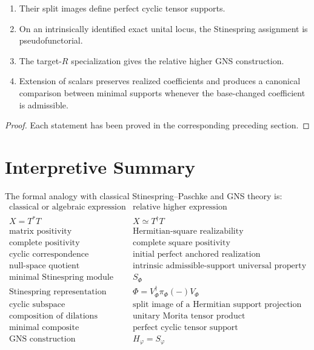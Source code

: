 \begin{theorem}
\begin{enumerate}
  \item Their split images define perfect cyclic tensor supports.

  \item On an intrinsically identified exact unital locus, the Stinespring
  assignment is pseudofunctorial.

  \item The target-\(R\) specialization gives the relative higher GNS
  construction.

  \item Extension of scalars preserves realized coefficients and produces a
  canonical comparison between minimal supports whenever the base-changed
  coefficient is admissible.
\end{enumerate}
\end{theorem}

\begin{proof}
Each statement has been proved in the corresponding preceding section.
\end{proof}

\section{Interpretive Summary}
\label{sec:higher-stinespring-interpretive-summary}

The formal analogy with classical Stinespring--Paschke and GNS theory is:
\[
\begin{array}{c|c}
\text{classical or algebraic expression}
&
\text{relative higher expression}
\\
\hline
X=T^*T
&
X\simeq T^\dagger T
\\
\text{matrix positivity}
&
\text{Hermitian-square realizability}
\\
\text{complete positivity}
&
\text{complete square positivity}
\\
\text{cyclic correspondence}
&
\text{initial perfect anchored realization}
\\
\text{null-space quotient}
&
\text{intrinsic admissible-support universal property}
\\
\text{minimal Stinespring module}
&
S_\Phi
\\
\text{Stinespring representation}
&
\Phi=V_\Phi^\dagger\pi_\Phi(-)V_\Phi
\\
\text{cyclic subspace}
&
\text{split image of a Hermitian support projection}
\\
\text{composition of dilations}
&
\text{unitary Morita tensor product}
\\
\text{minimal composite}
&
\text{perfect cyclic tensor support}
\\
\text{GNS construction}
&
H_\varphi=S_\varphi
\end{array}
\]

